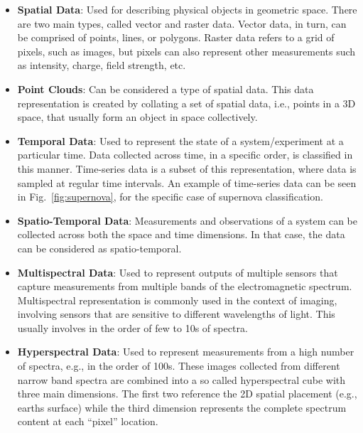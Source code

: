     \begin{itemize}
        \item \textbf{Spatial Data}: Used for describing physical objects in geometric space. There are two main types, called vector and raster data. 
        Vector data, in turn, can be comprised of points, lines, or polygons. Raster data refers to a grid of pixels, such as images, but pixels can also represent other measurements such as intensity, charge, field strength, etc.
        \item \textbf{Point Clouds}: Can be considered a type of spatial data. 
        This data representation is created by collating a set of spatial data, i.e., points in a 3D space, that usually form an object in space collectively. 
        \item \textbf{Temporal Data}: Used to represent the state of a system/experiment at a particular time. Data collected across time, in a specific order, is classified in this manner. 
        Time-series data is a subset of this representation, where data is sampled at regular time intervals. An example of time-series data can be seen in Fig.~\ref{fig:supernova}, for the specific case of supernova classification.
        \item \textbf{Spatio-Temporal Data}: Measurements and observations of a system can be collected across both the space and time dimensions. 
        In that case, the data can be considered as spatio-temporal. 
        \item \textbf{Multispectral Data}: Used to represent outputs of multiple sensors that capture measurements from multiple bands of the electromagnetic spectrum. Multispectral representation is commonly used in the context of imaging, involving sensors that are sensitive to different wavelengths of light. 
        This usually involves in the order of few to 10s of spectra.    
        \item \textbf{Hyperspectral Data}: Used to represent measurements from a high number of spectra, e.g., in the order of 100s. 
        These images collected from different narrow band spectra are combined into a so called hyperspectral cube with three main dimensions. 
        The first two reference the 2D spatial placement (e.g., earths surface) while the third dimension represents the complete spectrum content at each ``pixel'' location.  
    \end{itemize}  

